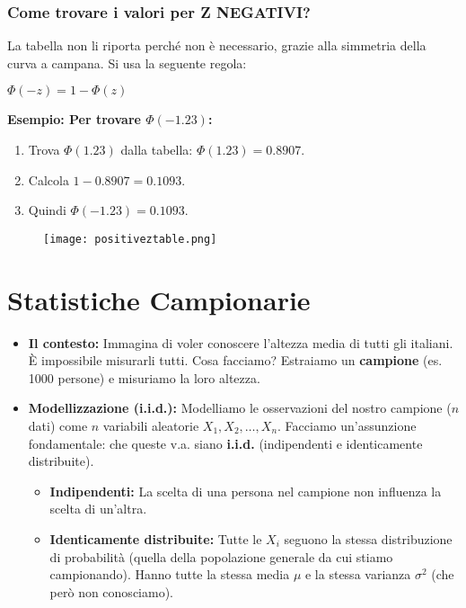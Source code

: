 \documentclass[a4paper, 11pt]{article}
\theoremstyle{definition}
\begin{document}
\subsubsection*{Come trovare i valori per Z NEGATIVI?}
La tabella non li riporta perché non è necessario, grazie alla simmetria della curva a campana. Si usa la seguente regola:
\begin{formulabox}
    $\Phi(-z) = 1 - \Phi(z)$
\end{formulabox}
\textbf{Esempio: Per trovare $\Phi(-1.23)$:}
\begin{enumerate}
    \item Trova $\Phi(1.23)$ dalla tabella: $\Phi(1.23) = 0.8907$.
    \item Calcola $1 - 0.8907 = 0.1093$.
    \item Quindi $\Phi(-1.23) = 0.1093$.
\end{enumerate}
\begin{figure}[h!]
    \centering
    \texttt{[image: positiveztable.png]}
\end{figure}
\newpage
\section{Statistiche Campionarie}
\begin{itemize}
    \item \textbf{Il contesto:} Immagina di voler conoscere l'altezza media di tutti gli italiani. È impossibile misurarli tutti. Cosa facciamo? Estraiamo un \textbf{campione} (es. 1000 persone) e misuriamo la loro altezza.

    \item \textbf{Modellizzazione (i.i.d.):} Modelliamo le osservazioni del nostro campione ($n$ dati) come $n$ variabili aleatorie $X_1, X_2, \dots, X_n$. Facciamo un'assunzione fondamentale: che queste v.a. siano \textbf{i.i.d.} (indipendenti e identicamente distribuite).
    \begin{itemize}
        \item \textbf{Indipendenti:} La scelta di una persona nel campione non influenza la scelta di un'altra.
        \item \textbf{Identicamente distribuite:} Tutte le $X_i$ seguono la stessa distribuzione di probabilità (quella della popolazione generale da cui stiamo campionando). Hanno tutte la stessa media $\mu$ e la stessa varianza $\sigma^2$ (che però non conosciamo).
    \end{itemize}
\end{itemize}
\end{document}
